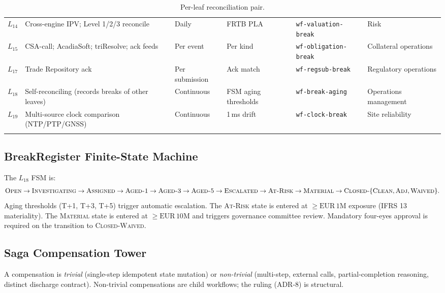 \documentclass[11pt,a4paper]{article}
\begin{document}
\begin{center}
\begin{longtable}{@{}p{1.0cm}p{4.4cm}p{1.7cm}p{2.4cm}p{2.6cm}p{3.2cm}@{}}
$L_{14}$ & Cross-engine IPV; Level 1/2/3 reconcile      & Daily       & FRTB PLA       & \texttt{wf-valuation-break}    & Risk \\
$L_{15}$ & CSA-call; AcadiaSoft; triResolve; ack feeds  & Per event   & Per kind       & \texttt{wf-obligation-break}   & Collateral operations \\
$L_{17}$ & Trade Repository ack                         & Per submission & Ack match   & \texttt{wf-regsub-break}       & Regulatory operations \\
$L_{18}$ & Self-reconciling (records breaks of other leaves) & Continuous & FSM aging thresholds & \texttt{wf-break-aging} & Operations management \\
$L_{19}$ & Multi-source clock comparison (NTP/PTP/GNSS)  & Continuous   & 1\,ms drift  & \texttt{wf-clock-break}        & Site reliability \\
\caption{Per-leaf reconciliation pair.}
\label{tab:reconciliation}
\end{longtable}
\end{center}

\subsection{BreakRegister Finite-State Machine}
\label{sec:operational-fsm}

The $L_{18}$ FSM is:
\[
\textsc{Open} \to \textsc{Investigating} \to \textsc{Assigned} \to \textsc{Aged-1} \to \textsc{Aged-3} \to \textsc{Aged-5} \to \textsc{Escalated} \to \textsc{At-Risk} \to \textsc{Material} \to \textsc{Closed-}\{\textsc{Clean}, \textsc{Adj}, \textsc{Waived}\}.
\]
Aging thresholds (T+1, T+3, T+5) trigger automatic escalation. The \textsc{At-Risk} state is entered at $\ge \mathrm{EUR}\,1\mathrm{M}$ exposure (IFRS 13 materiality). The \textsc{Material} state is entered at $\ge \mathrm{EUR}\,10\mathrm{M}$ and triggers governance committee review. Mandatory four-eyes approval is required on the transition to \textsc{Closed-Waived}.

\subsection{Saga Compensation Tower}
\label{sec:operational-saga}

A compensation is \emph{trivial} (single-step idempotent state mutation) or \emph{non-trivial} (multi-step, external calls, partial-completion reasoning, distinct discharge contract). Non-trivial compensations are child workflows; the ruling (ADR-8) is structural.
\end{document}
